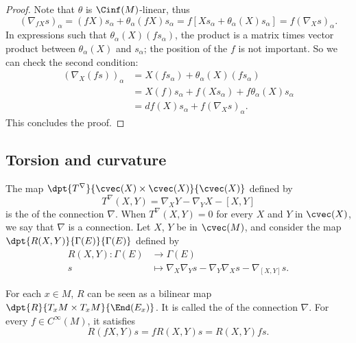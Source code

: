\begin{proof}
Note that $\theta$ is $\Cinf(M)$-linear, thus
\begin{equation}
  (\nabla_{fX}s)_{\alpha}=(fX)s_{\alpha}+\theta_{\alpha}(fX)s_{\alpha}
                        =f[ Xs_{\alpha}+\theta_{\alpha}(X)s_{\alpha} ]
			=f(\nabla_Xs)_{\alpha}.
\end{equation}
In expressions such that $\theta_{\alpha}(X)(fs_{\alpha})$, the product is a matrix times vector product between $\theta_{\alpha}(X)$ and $s_{\alpha}$; the position of the $f$ is not important. So we can check the second condition:
\begin{equation}
\begin{split}
(\nabla_X(fs))_{\alpha}&=X(fs_{\alpha})+\theta_{\alpha}(X)(fs_{\alpha}) \\
                     &=X(f)s_{\alpha}+f(Xs_{\alpha})+f\theta_{\alpha}(X)s_{\alpha}\\
		     &=df(X)s_{\alpha}+f(\nabla_Xs)_{\alpha}.
\end{split}
\end{equation}
This concludes the proof.
\end{proof}


\subsection{Torsion and curvature}

The map $\dpt{T^{\nabla}}{\cvec(X)\times\cvec(X)}{\cvec(X)}$ defined by
\begin{equation}
     T^{\nabla}(X,Y)=\nabla_XY-\nabla_YX-[X,Y]\label{deftorsion}
\end{equation}
is the  of the connection $\nabla$. When $T^{\nabla}(X,Y)=0$ for every $X$ and $Y$ in $\cvec(X)$, we say that $\nabla$ is a  connection. Let $X$, $Y$ be in $\cvec(M)$, and consider the map $\dpt{R(X,Y)}{\Gamma(E)}{\Gamma(E)}$ defined by
		\begin{equation}
		\begin{aligned}
			R(X,Y) \colon \Gamma(E) &\to \Gamma(E)\\
			s&\mapsto \nabla_X\nabla_Ys-\nabla_Y\nabla_Xs-\nabla_{[X,Y]}s.
		\end{aligned}
	\end{equation}

For each $x\in M$, $R$ can be seen as a bilinear map $\dpt{R}{T_xM\times T_xM}{\End(E_x)}$. It is called the  of the connection $\nabla$. For every $f\in C^{\infty}(M)$, it satisfies
\[
 R(fX,Y)s=fR(X,Y)s=R(X,Y)fs.
\]

